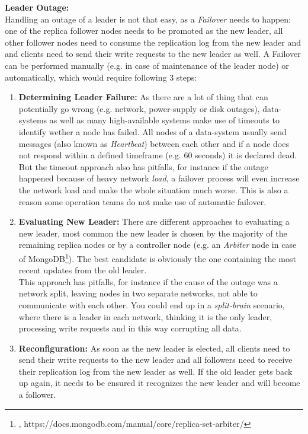 {\textbf{Leader Outage:}\\
Handling an outage of a leader is not that easy, as a \textit{Failover} needs to happen: one of the replica follower nodes needs to be promoted as the new leader, all other follower nodes need to consume the replication log from the new leader and and clients need to send their write requests to the new leader as well. A Failover can be performed manually (e.g. in case of maintenance of the leader node) or automatically, which would require following 3 steps:\\

\begin{enumerate}
\item \textbf{Determining Leader Failure:} As there are a lot of thing that can potentially go wrong (e.g. network, power-supply or disk outages), data-systems as well as many high-available systems make use of timeouts to identify wether a node has failed. All nodes of a data-system usually send messages (also known as \textit{Heartbeat}) between each other and if a node does not respond within a defined timeframe (e.g. 60 seconds) it is declared dead. \\
But the timeout approach also has pitfalls, for instance if the outage happened because of heavy network \textit{load}, a failover process will even increase the network load and make the whole situation much worse. This is also a reason some operation teams do not make use of automatic failover.
\item \textbf{Evaluating New Leader:} There are different approaches to evaluating a new leader, most common the new leader is chosen by the majority of the remaining replica nodes or by a controller node (e.g. an \textit{Arbiter} node in case of MongoDB\footnote{\cite{MDBARB}, https://docs.mongodb.com/manual/core/replica-set-arbiter/}). The best candidate is obviously the one containing the most recent updates from the old leader.\\
This approach has pitfalls, for instance if the cause of the outage was a network split, leaving nodes in two separate networks, not able to communicate with each other. You could end up in a \textit{split-brain} scenario, where there is a leader in each network, thinking it is the only leader, processing write requests and in this way corrupting all data.
\item \textbf{Reconfiguration:} As soon as the new leader is elected, all clients need to send their write requests to the new leader and all followers need to receive their replication log from the new leader as well. If the old leader gets back up again, it needs to be ensured it recognizes the new leader and will become a follower.
\end{enumerate}

}
